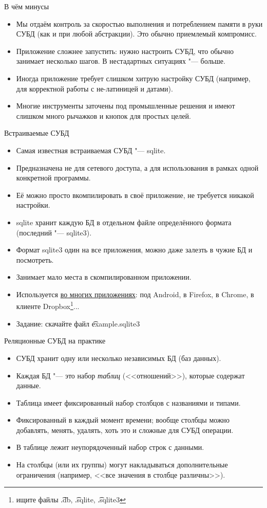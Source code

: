 \begin{frame}{В чём минусы}
	\begin{itemize}
		\item
			Мы отдаём контроль за скоростью выполнения и потреблением памяти в руки СУБД
			(как и при любой абстракции).
			Это обычно приемлемый компромисс.
		\item
			Приложение сложнее запустить: нужно настроить СУБД, что обычно занимает несколько шагов.
			В нестадартных ситуациях "--- больше.
		\item
			Иногда приложение требует слишком хитрую настройку СУБД (например, для корректной работы
			с не-латиницей и датами).
		\item
			Многие инструменты заточены под промышленные решения и имеют слишком много рычажков и кнопок
			для простых целей.
	\end{itemize}
\end{frame}

\begin{frame}{Встраиваемые СУБД}
	\begin{itemize}
		\item Самая известная встраиваемая СУБД "--- sqlite.
		\item Предназначена не для сетевого доступа, а для использования в рамках одной конкретной программы.
		\item Её можно просто вкомпилировать в своё приложение, не требуется никакой настройки.
		\item sqlite хранит каждую БД в отдельном файле определённого формата (последний "--- sqlite3).
		\item Формат sqlite3 один на все приложения, можно даже залезть в чужие БД и посмотреть.
		\item Занимает мало места в скомпилированном приложении.
		\item
			Используется \href{http://www.sqlite.org/famous.html}{во многих приложениях}:
			под Android, в Firefox, в Chrome, в клиенте Dropbox\footnote{ищите файлы \t{.db}, \t{.sqlite}, \t{.sqlite3}}...
		\item Задание: скачайте файл \t{example.sqlite3}
	\end{itemize}
\end{frame}

\begin{frame}{Реляционные СУБД на практике}
	\begin{itemize}
		\item СУБД хранит одну или несколько независимых БД (баз данных).
		\item Каждая БД "--- это набор \textit{таблиц} (<<отношений>>), которые содержат данные.
		\item Таблица имеет фиксированный набор столбцов с названиями и типами.
		\item Фиксированный в каждый момент времени; вообще столбцы можно добавлять, менять, удалять, хоть это и сложные для СУБД операции.
		\item В таблице лежит неупорядоченный набор строк с данными.
		\item На столбцы (или их группы) могут накладываться дополнительные ограничения (например, <<все значения в столбце различны>>).
	\end{itemize}
\end{frame}
